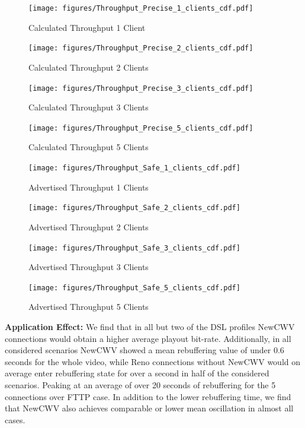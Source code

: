 \documentclass[10pt,sigconf]{acmart}
\begin{document}
\begin{figure}
  \centering
  \texttt{[image: figures/Throughput\_Precise\_1\_clients\_cdf.pdf]}
  \caption{Calculated Throughput 1 Client}
  \label{fig:throughput-precise-clients-1}
\end{figure}

\begin{figure}
  \centering
  \texttt{[image: figures/Throughput\_Precise\_2\_clients\_cdf.pdf]}
  \caption{Calculated Throughput 2 Clients}
  \label{fig:throughput-precise-clients-2}
\end{figure}

\begin{figure}
  \centering
  \texttt{[image: figures/Throughput\_Precise\_3\_clients\_cdf.pdf]}
  \caption{Calculated Throughput 3 Clients}
  \label{fig:throughput-precise-clients-3}
\end{figure}

\begin{figure}
  \centering
  \texttt{[image: figures/Throughput\_Precise\_5\_clients\_cdf.pdf]}
  \caption{Calculated Throughput 5 Clients}
  \label{fig:throughput-precise-clients-5}
\end{figure}

\begin{figure}
  \centering
  \texttt{[image: figures/Throughput\_Safe\_1\_clients\_cdf.pdf]}
  \caption{Advertised Throughput 1 Clients}
  \label{fig:throughput-safe-clients-1}
\end{figure}

\begin{figure}
  \centering
  \texttt{[image: figures/Throughput\_Safe\_2\_clients\_cdf.pdf]}
  \caption{Advertised Throughput 2 Clients}
  \label{fig:throughput-safe-clients-2}
\end{figure}

\begin{figure}
  \centering
  \texttt{[image: figures/Throughput\_Safe\_3\_clients\_cdf.pdf]}
  \caption{Advertised Throughput 3 Clients}
  \label{fig:throughput-safe-clients-3}
\end{figure}

\begin{figure}
  \centering
  \texttt{[image: figures/Throughput\_Safe\_5\_clients\_cdf.pdf]}
  \caption{Advertised Throughput 5 Clients}
  \label{fig:throughput-safe-clients-5}
\end{figure}

\textbf{Application Effect:} We find that in all but two of the DSL profiles NewCWV connections would obtain a higher average playout bit-rate. Additionally, in all considered scenarios NewCWV showed a mean rebuffering value of under 0.6 seconds for the whole video, while Reno connections without NewCWV would on average enter rebuffering state for over a second in half of the considered scenarios. Peaking at an average of over 20 seconds of rebuffering for the 5 connections over FTTP case. In addition to the lower rebuffering time, we find that NewCWV also achieves comparable or lower mean oscillation in almost all cases.
\end{document}

